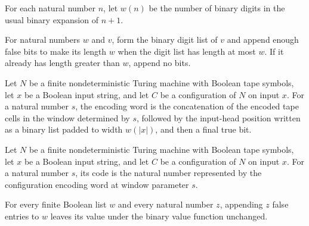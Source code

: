 \begin{definition}
\label{Complexity.Codec.wP}
\leanok
For each natural number $n$, let $w(n)$ be the number of binary digits in the usual
binary expansion of $n+1$.
\end{definition}

\begin{definition}
\label{Complexity.Codec.padBits}
\leanok
For natural numbers $w$ and $v$, form the binary digit list of $v$ and append enough
false bits to make its length $w$ when the digit list has length at most $w$. If it
already has length greater than $w$, append no bits.
\end{definition}

\begin{definition}
\label{Complexity.Codec.cfgWord}
\leanok
{}
Let $N$ be a finite nondeterministic Turing machine with Boolean tape symbols, let $x$
be a Boolean input string, and let $C$ be a configuration of $N$ on input $x$. For a
natural number $s$, the encoding word is the concatenation of the encoded tape cells in
the window determined by $s$, followed by the input-head position written as a binary
list padded to width $w(|x|)$, and then a final true bit.
\end{definition}

\begin{definition}
\label{Complexity.Codec.cfgCode}
\leanok
{}
Let $N$ be a finite nondeterministic Turing machine with Boolean tape symbols, let $x$
be a Boolean input string, and let $C$ be a configuration of $N$ on input $x$. For a
natural number $s$, its code is the natural number represented by the configuration
encoding word at window parameter $s$.
\end{definition}

\begin{lemma}
\label{Complexity.Codec.bitsVal_append_replicate}
\leanok
{}
For every finite Boolean list $w$ and every natural number $z$, appending $z$ false
entries to $w$ leaves its value under the binary value function unchanged.
\end{lemma}

